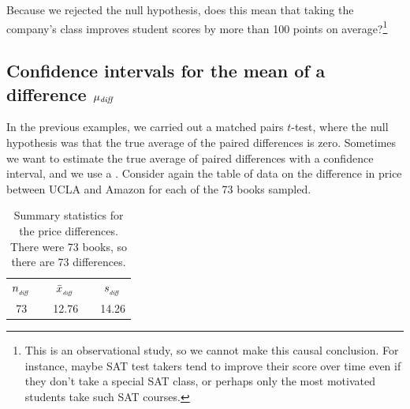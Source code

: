 \begin{exercise}
Because we rejected the null hypothesis, does this mean that taking the company's class improves student scores by more than 100 points on average?\footnote{This is an observational study, so we cannot make this causal conclusion. For instance, maybe SAT test takers tend to improve their score over time even if they don't take a special SAT class, or perhaps only the most motivated students take such SAT courses.}


\end{exercise}



\subsection{Confidence intervals for the mean of a difference $\mu_{\text{\emph{diff}}}$}

In the previous examples, we carried out a matched pairs $t$-test, where the null hypothesis was that the true average of the paired differences is zero. Sometimes we want to estimate the true average of paired differences with a confidence interval, and we use a . Consider again the table of data on the difference in price between UCLA and Amazon for each of the 73 books sampled.

\begin{table}[hh]
\centering
\begin{tabular}{ccccc}
\hline
$n_{_{\text{\emph{diff}}}}$	&\hspace{3mm}& $\bar{x}_{_{\text{\emph{diff}}}}$	&\hspace{3mm}& $s_{_{\text{\emph{diff}}}}$ \vspace{1mm}\\
73			&& 12.76				&& 14.26 \\
\hline
\end{tabular}
\caption{Summary statistics for the price differences. There were 73 books, so there are 73 differences.}
\label{textbooksSummaryStatsAgain}
\end{table}

